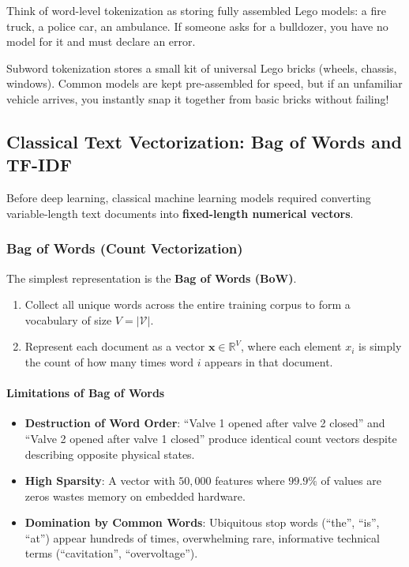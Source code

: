 \begin{analogy}
Think of word-level tokenization as storing fully assembled Lego models: a fire truck, a police car, an ambulance. If someone asks for a bulldozer, you have no model for it and must declare an error. 

Subword tokenization stores a small kit of universal Lego bricks (wheels, chassis, windows). Common models are kept pre-assembled for speed, but if an unfamiliar vehicle arrives, you instantly snap it together from basic bricks without failing!
\end{analogy}

\subsection{Classical Text Vectorization: Bag of Words and TF-IDF}\label{subsec:bow_tfidf}

Before deep learning, classical machine learning models required converting variable-length text documents into \textbf{fixed-length numerical vectors}.

\subsubsection{Bag of Words (Count Vectorization)}
The simplest representation is the \textbf{Bag of Words (BoW)}.
\begin{enumerate}
    \item Collect all unique words across the entire training corpus to form a vocabulary of size $V = |\mathcal{V}|$.
    \item Represent each document as a vector $\mathbf{x} \in \mathbb{R}^V$, where each element $x_i$ is simply the count of how many times word $i$ appears in that document.
\end{enumerate}

\paragraph{Limitations of Bag of Words}
\begin{itemize}
    \item \textbf{Destruction of Word Order}: ``Valve 1 opened after valve 2 closed'' and ``Valve 2 opened after valve 1 closed'' produce identical count vectors despite describing opposite physical states.
    \item \textbf{High Sparsity}: A vector with $50{,}000$ features where $99.9\%$ of values are zeros wastes memory on embedded hardware.
    \item \textbf{Domination by Common Words}: Ubiquitous stop words (``the'', ``is'', ``at'') appear hundreds of times, overwhelming rare, informative technical terms (``cavitation'', ``overvoltage'').
\end{itemize}

